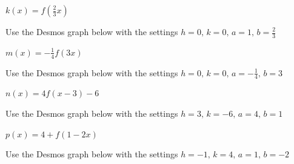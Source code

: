 \documentclass{ximera}
\begin{document}
\begin{question}
\begin{problem}
\begin{solution}
\begin{center} 
\end{center}
\end{solution} 
\end{problem}

\begin{problem}
$k(x) = f\left(\frac{2}{3}x\right)$

\begin{solution}
Use the Desmos graph below with the settings $h=0,\,k=0,\,a=1,\,b=\frac{2}{3}$

\begin{center} 
\end{center}
\end{solution} 
\end{problem}

\begin{problem}
$m(x) = -\frac{1}{4}f(3x)$

\begin{solution}
Use the Desmos graph below with the settings $h=0,\,k=0,\,a=-\frac{1}{4},\,b=3$

\begin{center} 
\end{center}
\end{solution} 
\end{problem}

\begin{problem}
$n(x) = 4f(x - 3) - 6$

\begin{solution}
Use the Desmos graph below with the settings $h=3,\,k=-6,\,a=4,\,b=1$

\begin{center} 
\end{center}
\end{solution} 
\end{problem}

\begin{problem}
$p(x) = 4 + f(1 - 2x)$

\begin{solution}
Use the Desmos graph below with the settings $h=-1,\,k=4,\,a=1,\,b=-2$

\begin{center} 
\end{center}
\end{solution} 
\end{problem}


\end{question}
\end{document}

